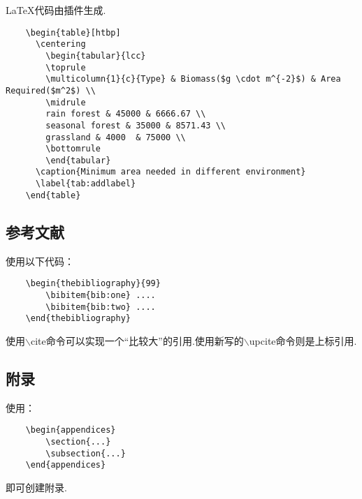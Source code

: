 \documentclass[bwprint, withouttitlepage]{mathexpthesis}
\begin{document}
\LaTeX 代码由插件生成.
\begin{verbatim}
    \begin{table}[htbp]
      \centering
        \begin{tabular}{lcc}
        \toprule
        \multicolumn{1}{c}{Type} & Biomass($g \cdot m^{-2}$) & Area Required($m^2$) \\
        \midrule
        rain forest & 45000 & 6666.67 \\
        seasonal forest & 35000 & 8571.43 \\
        grassland & 4000  & 75000 \\
        \bottomrule
        \end{tabular}
      \caption{Minimum area needed in different environment}
      \label{tab:addlabel}
    \end{table}
\end{verbatim}

\subsection{参考文献}
使用以下代码：
\begin{verbatim}
    \begin{thebibliography}{99}
        \bibitem{bib:one} ....
        \bibitem{bib:two} ....
    \end{thebibliography}
\end{verbatim}

使用$\backslash$cite命令可以实现一个“比较大”的引用\cite{bib:one}.使用新写的$\backslash$upcite命令则是上标引用.

\subsection{附录}
使用：
\begin{verbatim}
    \begin{appendices}
        \section{...}
        \subsection{...}
    \end{appendices}
\end{verbatim}

即可创建附录.
\end{document}
